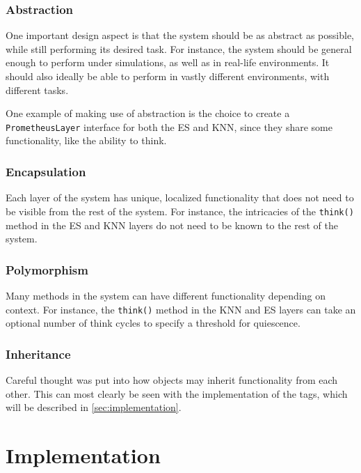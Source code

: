 \documentclass[titlepage,11pt]{article}
\newcommand{\code}[1]{\texttt{#1}}
\begin{document}
\subsubsection{Abstraction}

One important design aspect is that the system should be as abstract as possible, while still performing its desired task. For instance, the system should be general enough to perform under simulations, as well as in real-life environments. It should also ideally be able to perform in vastly different environments, with different tasks.

One example of making use of abstraction is the choice to create a \code{PrometheusLayer} interface for both the ES and KNN, since they share some functionality, like the ability to think.

\subsubsection{Encapsulation}

Each layer of the system has unique, localized functionality that does not need to be visible from the rest of the system. For instance, the intricacies of the \code{think()} method in the ES and KNN layers do not need to be known to the rest of the system.

\subsubsection{Polymorphism}

Many methods in the system can have different functionality depending on context. For instance, the \code{think()} method in the KNN and ES layers can take an optional number of think cycles to specify a threshold for quiescence.

\subsubsection{Inheritance}

Careful thought was put into how objects may inherit functionality from each other. This can most clearly be seen with the implementation of the tags, which will be described in \autoref{sec:implementation}.

\section{Implementation}
\label{sec:implementation}
\end{document}
